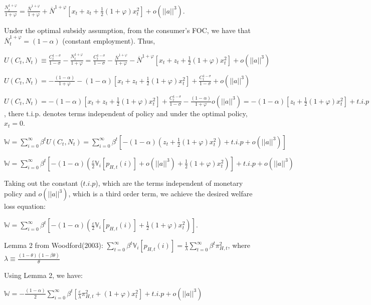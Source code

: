 \documentclass[
]{article}
\begin{document}
\(\displaystyle \frac{N_t^{1+\varphi}}{1+\varphi} = \frac{\overline{N}^{1+\varphi}}{1+\varphi} +\overline{N}^{1+\varphi}\left[ x_t+z_t + \frac{1}{2}(1+\varphi)x_t^2 \right] + o(||a||^3)\).

Under the optimal subsidy assumption, from the consumer's FOC, we have
that \(\overline{N}_t^{1+\varphi}=(1-\alpha)\) (constant employment).
Thus,

\(\displaystyle U(C_t,N_t)\equiv \frac{C_t^{1-\sigma}}{1-\sigma}-\frac{N_t^{1+\varphi}}{1+\varphi}= \frac{C_t^{1-\sigma}}{1-\sigma}- \frac{\overline{N}^{1+\varphi}}{1+\varphi} -\overline{N}^{1+\varphi}\left[ x_t+z_t + \frac{1}{2}(1+\varphi)x_t^2 \right] + o(||a||^3)\)

\(\displaystyle U(C_t,N_t) = - \frac{(1-\alpha)}{1+\varphi}-(1-\alpha)\left[ x_t+z_t + \frac{1}{2}(1+\varphi)x_t^2 \right] + \frac{C_t^{1-\sigma}}{1-\sigma}+ o(||a||^3)\)

\(\displaystyle U(C_t,N_t) = -(1-\alpha)\left[ x_t+z_t + \frac{1}{2}(1+\varphi)x_t^2 \right] + \frac{C_t^{1-\sigma}}{1-\sigma}- \frac{(1-\alpha)}{1+\varphi} o(||a||^3)= -(1-\alpha)\left[ z_t + \frac{1}{2}(1+\varphi)x_t^2 \right] + t.i.p+ o(||a||^3)\),
there t.i.p. denotes terms independent of policy and under the optimal
policy, \(x_t=0\).

\(\displaystyle \mathbb{W}= \sum_{i=0}^{\infty} \beta^tU(C_t,N_t) = \sum_{i=0}^{\infty} \beta^t \left[-(1-\alpha)\left( z_t + \frac{1}{2}(1+\varphi)x_t^2 \right) + t.i.p+ o(||a||^3) \right]\)

\(\displaystyle \mathbb{W}= \sum_{i=0}^{\infty} \beta^t \left[-(1-\alpha)\left( \frac{\varepsilon}{2}\mathbb{V}_i[p_{H,t}(i)] +o(||a||^3) + \frac{1}{2}(1+\varphi)x_t^2 \right) \right]+ t.i.p+ o(||a||^3)\)

Taking out the constant (\(t.i.p\)), which are the terms independent of
monetary policy and \(o(||a||^3)\), which is a third order term, we
achieve the desired welfare loss equation:

\(\displaystyle \mathbb{W}= \sum_{i=0}^{\infty} \beta^t \left[-(1-\alpha)\left( \frac{\varepsilon}{2}\mathbb{V}_i[p_{H,t}(i)] + \frac{1}{2}(1+\varphi)x_t^2 \right) \right]\).

Lemma 2 from Woodford(2003):
\(\displaystyle \sum_{t=0}^\infty \beta^t \mathbb{V}_i[p_{H,t}(i)]= \frac{1}{\lambda} \sum_{t=0}^\infty \beta^t \pi_{H,t}^2\),
where
\(\displaystyle \lambda \equiv \frac{(1-\theta)(1-\beta \theta)}{\theta}\)

Using Lemma 2, we have:

\(\displaystyle \mathbb{W}= -\frac{(1-\alpha)}{2}\sum_{i=0}^{\infty} \beta^t \left[ \frac{\varepsilon}{\lambda}\pi_{H,t}^2+ (1+\varphi)x_t^2 \right] + t.i.p + o(||a||^3)\)
\end{document}
